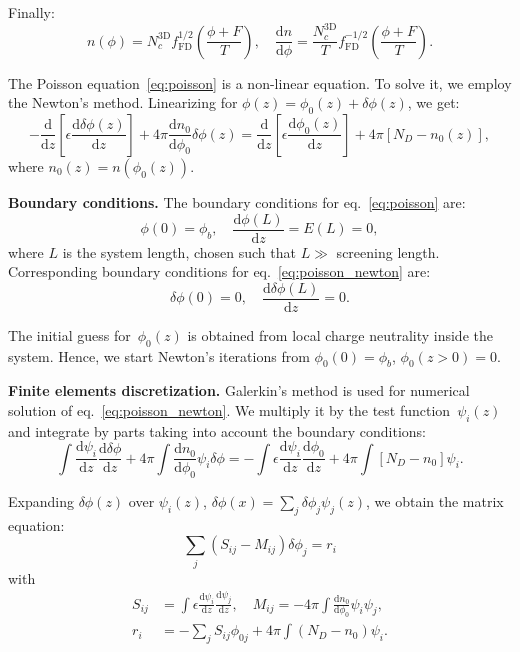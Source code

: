\documentclass[10pt]{article}
\newcommand{\dd}{\mathrm{d}}
\newcommand{\fFD}{f_{\mathrm{FD}}}
\begin{document}
Finally:
\begin{equation}
	n(\phi) = N_c^\mathrm{3D} \fFD^{1/2} \left( \frac{\phi + F}{T} \right), \quad
	\frac{\dd n}{\dd \phi} =
		\frac{N_c^\mathrm{3D}}{T} \fFD^{-1/2} \left( \frac{\phi + F}{T} \right).
\end{equation}

The Poisson equation~\eqref{eq:poisson} is a non-linear equation. To solve it, we employ
the Newton's method. Linearizing for $\phi(z) = \phi_0(z) + \delta\phi(z)$, we get:
\begin{equation}
	\label{eq:poisson_newton}
	- \frac{\dd}{\dd z} \left[ \epsilon \frac{\dd \delta\phi(z)}{\dd z} \right]
	+ 4\pi \frac{\dd n_0}{\dd \phi_0} \delta\phi(z)
	= \frac{\dd}{\dd z} \left[ \epsilon \frac{\dd \phi_0(z)}{\dd z} \right]
	+ 4\pi [N_D - n_0(z)],
\end{equation}
where $n_0(z) = n(\phi_0(z))$.

\textbf{Boundary conditions.} The boundary conditions for eq.~\eqref{eq:poisson} are:
\begin{equation}
	\phi(0) = \phi_b, \quad \frac{\dd \phi(L)}{\dd z} = E(L) = 0,
\end{equation}
where $L$ is the system length, chosen such that $L \gg$ screening length. Corresponding
boundary conditions for eq.~\eqref{eq:poisson_newton} are:
\begin{equation}
	\delta\phi(0) = 0, \quad \frac{\dd \delta\phi(L)}{\dd z} = 0.
\end{equation}

The initial guess for~$\phi_0(z)$ is obtained from local charge neutrality inside the
system. Hence, we start Newton's iterations from $\phi_0(0) = \phi_b$, $\phi_0(z > 0) = 0$.

\textbf{Finite elements discretization.} Galerkin's method is used for numerical solution
of eq.~\eqref{eq:poisson_newton}. We multiply it by the test function~$\psi_i(z)$ and
integrate by parts taking into account the boundary conditions:
\begin{equation}
	\int \frac{\dd \psi_i}{\dd z} \frac{\dd \delta\phi}{\dd z}
	+ 4\pi \int \frac{\dd n_0}{\dd \phi_0} \psi_i \delta\phi
	= - \int \epsilon \frac{\dd \psi_i}{\dd z} \frac{\dd \phi_0}{\dd z}
	+ 4\pi \int [N_D - n_0] \psi_i.
\end{equation}

Expanding $\delta\phi(z)$ over $\psi_i(z)$, $\delta\phi(x) = \sum_j \delta\phi_j \psi_j(z)$,
we obtain the matrix equation:
\begin{equation}
	\sum_j \left( S_{ij} - M_{ij} \right) \delta\phi_j = r_i
\end{equation}
with
\begin{equation}
\begin{split}
	S_{ij} &= \int \epsilon \frac{\dd \psi_i}{\dd z} \frac{\dd \psi_j}{\dd z}, \quad
	M_{ij} = -4\pi \int \frac{\dd n_0}{\dd \phi_0} \psi_i \psi_j, \\
	r_i &= - \sum_j S_{ij} \phi_{0j} + 4\pi \int (N_D - n_0) \psi_i.
\end{split}
\end{equation}
\end{document}
